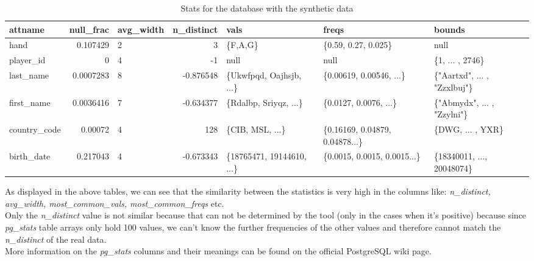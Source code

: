\begin{table}[H]
\caption{Stats for the database with the synthetic data}
\label{tab:synthetic_data_stats}
\centering
\begin{tabularx}{\linewidth}{|l|r|X|r|X|X|X|}
\hline
	attname & null\_frac & avg\_width & n\_distinct & vals & freqs & bounds
	\\ \hline
hand          & 0.107429    & 2 & 3         & \{F,A,G\}                     & \{0.59, 0.27, 0.025\}        & null                                \\ \hline
player\_id    & 0           & 4 & -1        & null                          & null                              & \{1, ... , 2746\}           \\ \hline
last\_name    & 0.0007283 & 8 & -0.876548 & \{Ukwfpqd, Oajhsjb, ...\}        & \{0.00619, 0.00546, ...\}     & \{"Aartxd", ... , "Zzxlbuj"\} \\ \hline
first\_name   & 0.0036416  & 7 & -0.634377 & \{Rdalbp, Sriyqz, ...\} & \{0.0127, 0.0076, ...\}        & \{"Abmydx", ... ,  "Zzylni"\}      \\ \hline
country\_code & 0.00072       & 4 & 128       & \{CIB, MSL, ...\}     & \{0.16169, 0.04879, 0.04878...\} & \{DWG, ... , YXR\}                  \\ \hline
birth\_date   & 0.217043    & 4 & -0.673343 & \{18765471, 19144610, ...\}      & \{0.0015, 0.0015, 0.0015...\}     & \{18340011, ..., 20048074\}         \\ \hline
\end{tabularx}
\end{table}
As displayed in the above tables, we can see that the similarity between the statistics is very high in the columns like: \textit{n\_distinct, avg\_width, most\_common\_vals, most\_common\_freqs} etc.\\
\newline
Only the \textit{n\_distinct} value is not similar because that can not be determined by the tool (only in the cases when it's positive) because since \textit{pg\_stats} table arrays only hold 100 values, we can't know the further frequencies of the other values and therefore cannot match the \textit{n\_distinct} of the real data.\\
\newline
More information on the \textit{pg\_stats} columns and their meanings can be found on the official PostgreSQL wiki page.